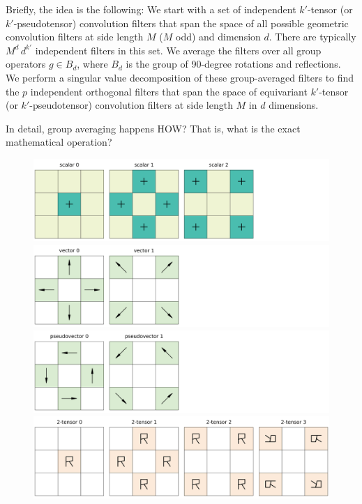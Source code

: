 \documentclass{article}
\theoremstyle{plain}
\begin{document}
Briefly, the idea is the following:
We start with a set of independent $k'$-tensor (or $k'$-pseudotensor) convolution filters that span the space of all possible geometric convolution filters at side length $M$ ($M$ odd) and dimension $d$.
There are typically $M^d\,d^{k'}$ independent filters in this set.
We average the filters over all group operators $g\in B_d$, where $B_d$ is the group of 90-degree rotations and reflections.
We perform a singular value decomposition of these group-averaged filters to find the $p$ independent orthogonal filters that span the space of equivariant $k'$-tensor (or $k'$-pseudotensor) convolution filters at side length $M$ in $d$ dimensions.

In detail, group averaging happens HOW? That is, what is the exact mathematical operation?

\begin{figure}[tp]
  \begin{mdframed}
  \color{captiongray}
  \begin{center}
\includegraphics[width=\textwidth]{notebooks/filter+0_2_3.png}\\
\includegraphics[width=\textwidth]{notebooks/filter+1_2_3.png}\\
\includegraphics[width=\textwidth]{notebooks/filter-1_2_3.png}
\includegraphics[width=\textwidth]{notebooks/filter+2_2_3.png}\\

\end{center}
\end{mdframed}
\end{figure}
\end{document}
